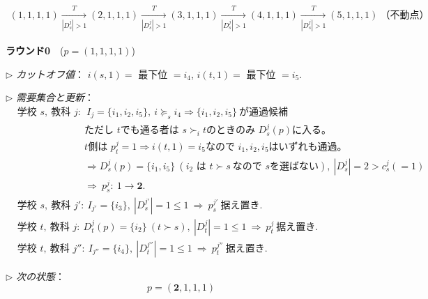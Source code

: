 \documentclass[12pt, a4paper]{article}
\theoremstyle{definition}
\theoremstyle{remark}
\theoremstyle{plain}
\begin{document}



\[
\renewcommand{\arraystretch}{1.15}
\begin{array}{c}
\boxed{(1,1,1,1)} \xrightarrow[|D^j_s|>1]{T} \boxed{(2,1,1,1)} \xrightarrow[|D^j_s|>1]{T} \boxed{(3,1,1,1)} \xrightarrow[|D^j_s|>1]{T} \boxed{(4,1,1,1)} \xrightarrow[|D^j_s|>1]{T} \boxed{(5,1,1,1)}\ \text{（不動点）}
\end{array}
\]

\noindent\textbf{ラウンド0}\ \ (\(p=(1,1,1,1)\))
\medskip

\noindent\(\triangleright\) \textit{カットオフ値}：
\(i(s,1)=\) 最下位 \(=i_4\), \quad
\(i(t,1)=\) 最下位 \(=i_5\).

\noindent\(\triangleright\) \textit{需要集合と更新}：
\[
\begin{aligned}
&\text{学校 }s,\ \text{教科 }j:\ \ I_j=\{i_1,i_2,i_5\},\ i\succeq_s i_4 \Rightarrow \{i_1,i_2,i_5\}\ \text{が通過候補}\\
&\phantom{\text{学校 }s,\ \text{教科 }j:}\ \text{ただし }t\text{でも通る者は }s\succ_i t\text{のときのみ }D^j_s(p)\text{に入る。}\\
&\phantom{\text{学校 }s,\ \text{教科 }j:}\ t\text{側は }p^j_t=1\Rightarrow i(t,1)=i_5\text{なので }i_1,i_2,i_5\text{はいずれも通過。}\\
&\phantom{\text{学校 }s,\ \text{教科 }j:}\ \Rightarrow D^j_s(p)=\{i_1,i_5\}\ (\text{\(i_2\) は }t\succ s\ \text{なので }s\text{を選ばない}),\ |D^j_s|=2>c^j_s(=1)\\
&\phantom{\text{学校 }s,\ \text{教科 }j:}\ \Rightarrow\ p^j_s:\ 1\to \mathbf{2}.\\[2mm]
&\text{学校 }s,\ \text{教科 }j':\ I_{j'}=\{i_3\},\ |D^{j'}_s|=1\le 1\ \Rightarrow\ p^{j'}_s\ \text{据え置き}.\\
&\text{学校 }t,\ \text{教科 }j:\ D^j_t(p)=\{i_2\}\ (t\succ s),\ |D^j_t|=1\le 1\ \Rightarrow\ p^j_t\ \text{据え置き}.\\
&\text{学校 }t,\ \text{教科 }j'':\ I_{j''}=\{i_4\},\ |D^{j''}_t|=1\le 1\ \Rightarrow\ p^{j''}_t\ \text{据え置き}.
\end{aligned}
\]

\noindent\(\triangleright\) \textit{次の状態}：
\[
p=(\mathbf{2},1,1,1)
\]
\end{document}
